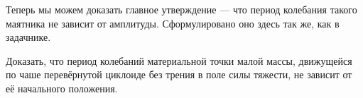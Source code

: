 Теперь мы можем доказать главное утверждение --- что период колебания такого маятника не зависит от амплитуды. Сформулировано оно здесь так же, как в задачнике.

\begin{problem}
	Доказать, что период колебаний материальной точки малой массы, движущейся по чаше перевёрнутой циклоиде без трения в поле силы тяжести, не зависит от её начального положения.
\end{problem}



